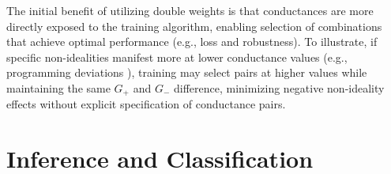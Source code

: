 
\noindent The initial benefit of utilizing double weights is that conductances are more directly exposed to the training algorithm, enabling selection of combinations that achieve optimal performance (e.g., loss and robustness). To illustrate, if specific non-idealities manifest more at lower conductance values (e.g., programming deviations \cite{kim2016voltage}), training may select pairs at higher values while maintaining the same $G_+$ and $G_-$ difference, minimizing negative non-ideality effects without explicit specification of conductance pairs.

\section{Inference and Classification}




